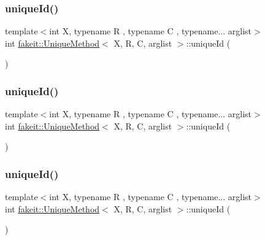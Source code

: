 \subsubsection{\texorpdfstring{uniqueId()}{uniqueId()}\hspace{0.1cm}{\footnotesize\ttfamily [3/9]}}
{\footnotesize\ttfamily template$<$int X, typename R , typename C , typename... arglist$>$ \\
int \mbox{\hyperlink{structfakeit_1_1UniqueMethod}{fakeit\+::\+Unique\+Method}}$<$ X, R, C, arglist $>$\+::unique\+Id (\begin{DoxyParamCaption}{ }\end{DoxyParamCaption})\hspace{0.3cm}{\ttfamily [inline]}}

\mbox{\label{structfakeit_1_1UniqueMethod_a9a7108ad7e5700aa48417deb30c1e2b5}} 
\subsubsection{\texorpdfstring{uniqueId()}{uniqueId()}\hspace{0.1cm}{\footnotesize\ttfamily [4/9]}}
{\footnotesize\ttfamily template$<$int X, typename R , typename C , typename... arglist$>$ \\
int \mbox{\hyperlink{structfakeit_1_1UniqueMethod}{fakeit\+::\+Unique\+Method}}$<$ X, R, C, arglist $>$\+::unique\+Id (\begin{DoxyParamCaption}{ }\end{DoxyParamCaption})\hspace{0.3cm}{\ttfamily [inline]}}

\mbox{\label{structfakeit_1_1UniqueMethod_a9a7108ad7e5700aa48417deb30c1e2b5}} 
\subsubsection{\texorpdfstring{uniqueId()}{uniqueId()}\hspace{0.1cm}{\footnotesize\ttfamily [5/9]}}
{\footnotesize\ttfamily template$<$int X, typename R , typename C , typename... arglist$>$ \\
int \mbox{\hyperlink{structfakeit_1_1UniqueMethod}{fakeit\+::\+Unique\+Method}}$<$ X, R, C, arglist $>$\+::unique\+Id (\begin{DoxyParamCaption}{ }\end{DoxyParamCaption})\hspace{0.3cm}{\ttfamily [inline]}}

